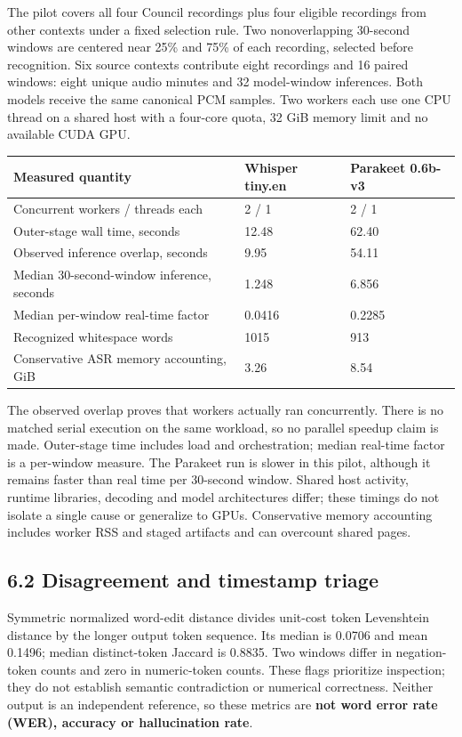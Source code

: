 \documentclass[
  10pt,
]{article}
\begin{document}
The pilot covers all four Council recordings plus four eligible
recordings from other contexts under a fixed selection rule. Two
nonoverlapping 30-second windows are centered near 25\% and 75\% of each
recording, selected before recognition. Six source contexts contribute
eight recordings and 16 paired windows: eight unique audio minutes and
32 model-window inferences. Both models receive the same canonical PCM
samples. Two workers each use one CPU thread on a shared host with a
four-core quota, 32 GiB memory limit and no available CUDA GPU.

\begin{longtable}[]{@{}lll@{}}
\toprule\noalign{}
Measured quantity & Whisper tiny.en & Parakeet 0.6b-v3 \\
\midrule\noalign{}
\endhead
\bottomrule\noalign{}
\endlastfoot
Concurrent workers / threads each & 2 / 1 & 2 / 1 \\
Outer-stage wall time, seconds & 12.48 & 62.40 \\
Observed inference overlap, seconds & 9.95 & 54.11 \\
Median 30-second-window inference, seconds & 1.248 & 6.856 \\
Median per-window real-time factor & 0.0416 & 0.2285 \\
Recognized whitespace words & 1015 & 913 \\
Conservative ASR memory accounting, GiB & 3.26 & 8.54 \\
\end{longtable}

The observed overlap proves that workers actually ran concurrently.
There is no matched serial execution on the same workload, so no
parallel speedup claim is made. Outer-stage time includes load and
orchestration; median real-time factor is a per-window measure. The
Parakeet run is slower in this pilot, although it remains faster than
real time per 30-second window. Shared host activity, runtime libraries,
decoding and model architectures differ; these timings do not isolate a
single cause or generalize to GPUs. Conservative memory accounting
includes worker RSS and staged artifacts and can overcount shared pages.

\subsection{6.2 Disagreement and timestamp
triage}\label{disagreement-and-timestamp-triage}

Symmetric normalized word-edit distance divides unit-cost token
Levenshtein distance by the longer output token sequence. Its median is
0.0706 and mean 0.1496; median distinct-token Jaccard is 0.8835. Two
windows differ in negation-token counts and zero in numeric-token
counts. These flags prioritize inspection; they do not establish
semantic contradiction or numerical correctness. Neither output is an
independent reference, so these metrics are \textbf{not word error rate
(WER), accuracy or hallucination rate}.
\end{document}
